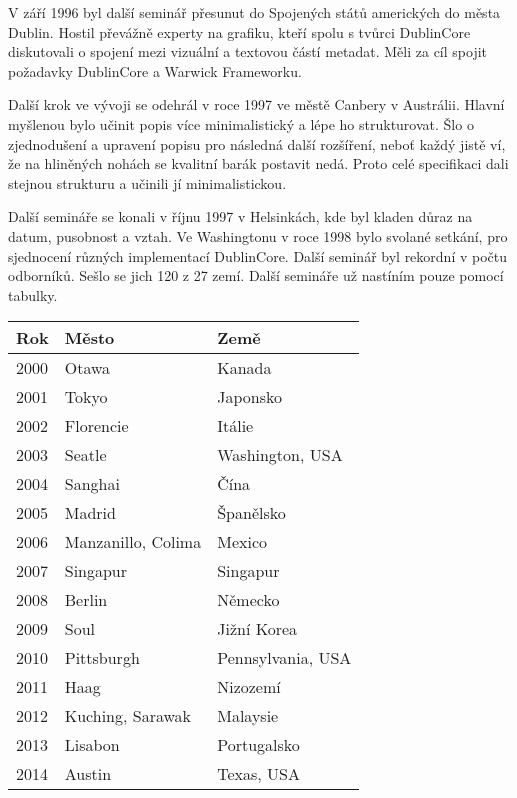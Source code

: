 \par V září 1996 byl další seminář přesunut do Spojených států amerických do města Dublin. Hostil převážně experty na grafiku, kteří spolu s tvůrci DublinCore diskutovali o spojení mezi vizuální a textovou částí metadat. Měli za cíl spojit požadavky DublinCore a Warwick Frameworku.

\par Další krok ve vývoji se odehrál v roce 1997 ve městě Canbery v Austrálii. Hlavní myšlenou bylo učinit popis více minimalistický a lépe ho strukturovat. Šlo o zjednodušení a upravení popisu pro následná další rozšíření, neboť každý jistě ví, že na hliněných nohách se kvalitní barák postavit nedá. Proto celé specifikaci dali stejnou strukturu a učinili jí minimalistickou.

\par Další semináře se konali v říjnu 1997 v Helsinkách, kde byl kladen důraz na datum, pusobnost a vztah. Ve Washingtonu v roce 1998 bylo svolané setkání, pro sjednocení různých implementací DublinCore. Další seminář byl rekordní v počtu odborníků. Sešlo se jich 120 z 27 zemí. Další semináře už nastíním pouze pomocí tabulky.

\begin{tabular}{| l | l | l |}
\hline
Rok & Město & Země\\
\hline
2000 & Otawa & Kanada\\
\hline
2001 & Tokyo & Japonsko\\
\hline
2002 & Florencie & Itálie\\
\hline
2003 & Seatle & Washington, USA\\
\hline
2004 & Sanghai & Čína\\
\hline
2005 & Madrid & Španělsko\\
\hline
2006 & Manzanillo, Colima & Mexico\\
\hline
2007 & Singapur & Singapur\\
\hline
2008 & Berlin & Německo\\
\hline
2009 & Soul & Jižní Korea\\
\hline
2010 & Pittsburgh & Pennsylvania, USA\\
\hline
2011 & Haag & Nizozemí\\
\hline
2012 & Kuching, Sarawak & Malaysie\\
\hline
2013 & Lisabon & Portugalsko\\
\hline
2014 & Austin & Texas, USA\\
\hline
\end{tabular}

